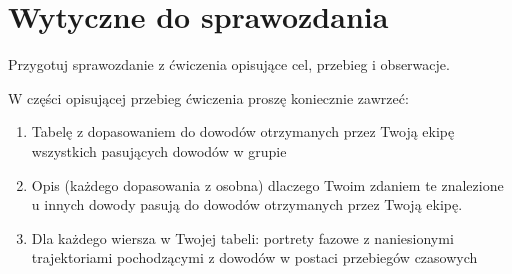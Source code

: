 \documentclass{sprawozdanie-agh}
\begin{document}


\section{Wytyczne do sprawozdania}

Przygotuj sprawozdanie z ćwiczenia opisujące cel, przebieg i obserwacje.

W części opisującej przebieg ćwiczenia proszę koniecznie zawrzeć:    
\begin{enumerate}
        \item Tabelę z dopasowaniem do dowodów otrzymanych przez Twoją ekipę wszystkich pasujących dowodów w grupie
        \item Opis (każdego dopasowania z osobna) dlaczego Twoim zdaniem te znalezione u innych dowody pasują do dowodów otrzymanych przez Twoją ekipę. 
        \item Dla każdego wiersza w Twojej tabeli: portrety fazowe z naniesionymi trajektoriami pochodzącymi z dowodów w postaci przebiegów czasowych 
\end{enumerate}


\end{document}
